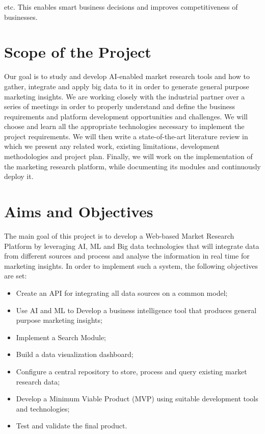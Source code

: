 etc. This enables smart business decisions and improves competitiveness of businesses. 

\newpage
\section{Scope of the Project}
Our goal is to study and develop AI-enabled market research tools and how to gather, integrate and apply big data to it in order to generate general purpose marketing insights. We are working closely with the industrial partner over a series of meetings in order to properly understand and define the business requirements and platform development opportunities and challenges. We will choose and learn all the appropriate technologies necessary to implement the project requirements. We will then write a state-of-the-art literature review in which we present any related work, existing limitations, development methodologies and project plan. Finally, we will work on the implementation of the marketing research platform, while documenting its modules and continuously deploy it. 

\section{Aims and Objectives}
The main goal of this project is to develop a Web-based Market Research Platform by leveraging AI, ML and Big data technologies that will integrate data from different sources and process and analyse the information in real time for marketing insights. In order to implement such a system, the following objectives are set:
\begin{itemize}
	\item Create an API for integrating all data sources on a common model;
	\item Use AI and ML to Develop a business intelligence tool that produces general purpose marketing insights;
	\item Implement a Search Module;
	\item Build a data visualization dashboard;
	\item Configure a central repository to store, process and query existing market research data;
	\item Develop a Minimum Viable Product (MVP) using suitable development tools and technologies;
	\item Test and validate the final product.
\end{itemize}

